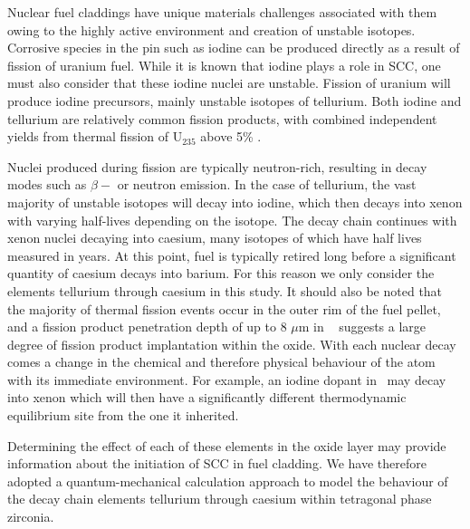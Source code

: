 Nuclear fuel claddings have unique materials challenges associated with them owing to the highly active environment and creation of unstable isotopes. Corrosive species in the pin such as iodine can be produced directly as a result of fission of uranium fuel. While it is known that iodine plays a role in SCC, one must also consider that these iodine nuclei are unstable. Fission of uranium will produce iodine precursors, mainly unstable isotopes of tellurium. Both iodine and tellurium are relatively common fission products, with combined independent yields from thermal fission of U$_{235}$ above 5\% \cite{kennett1956mass, iodine129fissionyield, imanishi1976independent, iodinefissionyields, iodine132, amiel1975odd}. 

Nuclei produced during fission are typically neutron-rich, resulting in decay modes such as $\beta-$ or neutron emission. In the case of tellurium, the vast majority of unstable isotopes will decay into iodine, which then decays into xenon with varying half-lives depending on the isotope. The decay chain continues with xenon nuclei decaying into caesium, many isotopes of which have half lives measured in years. At this point, fuel is typically retired long before a significant quantity of caesium decays into barium. For this reason we only consider the elements tellurium through caesium in this study. It should also be noted that the majority of thermal fission events occur in the outer rim of the fuel pellet, and a fission product penetration depth of up to 8 $\mu$m in \zirconia\ \cite{degueldre2001behaviour} suggests a large degree of fission product implantation within the oxide. With each nuclear decay comes a change in the chemical and therefore physical behaviour of the atom with its immediate environment. For example, an iodine dopant in \zirconia\ may decay into xenon which will then have a significantly different thermodynamic equilibrium site from the one it inherited.   

Determining the effect of each of these elements in the oxide layer may provide information about the initiation of SCC in fuel cladding. We have therefore adopted a quantum-mechanical calculation approach to model the behaviour of the decay chain elements tellurium through caesium within tetragonal phase zirconia. 

